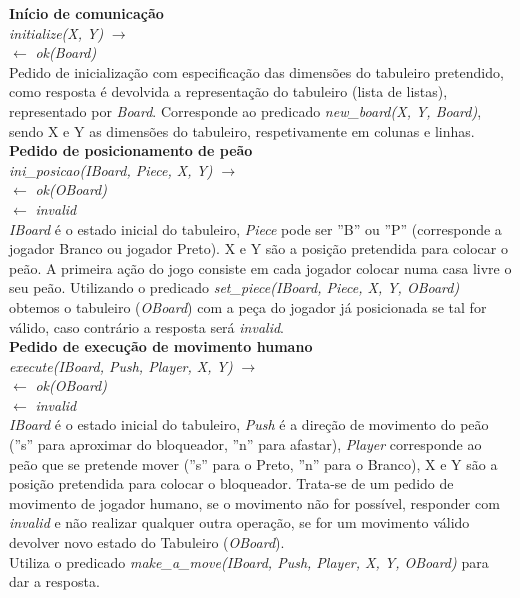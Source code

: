 \documentclass[15pt,a4paper]{article}
\begin{document}
\textbf{Início de comunicação}\\
\textit{initialize(X, Y)} $\rightarrow$ \\
\indent\indent\indent\indent	 $\leftarrow$ \textit{ok(Board)}\\
Pedido de inicialização com especificação das dimensões do tabuleiro pretendido, como resposta é devolvida a representação do tabuleiro (lista de listas), representado por \textit{Board}.
Corresponde ao predicado \textit{new\_board(X, Y, Board)}, sendo X e Y as dimensões do tabuleiro, respetivamente em colunas e linhas.
\\


\textbf{Pedido de posicionamento de peão}\\
\textit{ini\_posicao(IBoard, Piece, X, Y)} $\rightarrow$  \\
\indent\indent\indent\indent	$\leftarrow$ \textit{ok(OBoard)}\\
\indent\indent\indent\indent	$\leftarrow$ \textit{invalid}\\
\textit{IBoard} é o estado inicial do tabuleiro, \textit{Piece} pode ser  ''B'' ou ''P'' (corresponde a jogador Branco ou jogador Preto). X e Y são a posição pretendida para colocar o peão. 
A primeira ação do jogo consiste em cada jogador colocar numa casa livre o seu peão. Utilizando o predicado \textit{set\_piece(IBoard, Piece, X, Y, OBoard)} obtemos o tabuleiro (\textit{OBoard}) com a peça do jogador já posicionada se tal for válido, caso contrário a resposta será \textit{invalid}.
\\


\textbf{Pedido de execução de movimento humano}\\
\textit{execute(IBoard,  Push, Player, X, Y)} $\rightarrow$ \\
\indent\indent\indent\indent	$\leftarrow$ \textit{ok(OBoard)}\\
\indent\indent\indent\indent	$\leftarrow$ \textit{invalid}\\
\textit{IBoard} é o estado inicial do tabuleiro, \textit{Push} é a direção de movimento do peão (''s'' para aproximar do bloqueador, ''n'' para afastar), \textit{Player} corresponde ao peão que se pretende mover (''s'' para o Preto, ''n'' para o Branco), X e Y são a posição pretendida para colocar o bloqueador. 
Trata-se de um pedido de movimento de jogador humano, se o movimento não for possível, responder com \textit{invalid} e não realizar qualquer outra operação, se for um movimento válido devolver novo estado do Tabuleiro (\textit{OBoard}).\\
Utiliza o predicado \textit{make\_a\_move(IBoard,  Push, Player, X, Y, OBoard)} para dar a resposta.
\\
\end{document}

